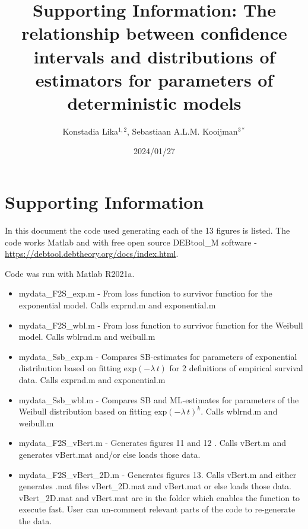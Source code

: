 \documentclass[12pt]{elsarticle}
\begin{document}
\title{Supporting Information: The relationship between confidence intervals and distributions of estimators for parameters of deterministic models}

\author{Konstadia Lika$^{1,2}$, 
        Sebastiaan A.L.M. Kooijman$^{3\ast}$}
  
\bigskip

\address{$^1$ Department of Biology, University of Crete, 70013, Heraklion, Greece}
\address{$^2$ Institute of Computational Mathematics,
Foundation of Research and Technology Hellas, 70013 Heraklion, Greece}
\address{$^3$  Amsterdam Institute for Life and Environment (A-LIFE), 
VU University Amsterdam, de Boelelaan 1087, 1081 HV, The Netherlands}
\address{$^\ast$ Corresponding author: bas.kooijman@vu.nl}

\date{2024/01/27}


\maketitle

\section{Supporting Information}

In this document the code used generating each of the 13 figures is listed. The code works Matlab\textsuperscript{\textcopyright} and with free open source DEBtool\_M software - \url{https://debtool.debtheory.org/docs/index.html}.

Code was run with Matlab\textsuperscript{\textcopyright} R2021a. 

\begin{itemize}
    \item mydata\_F2S\_exp.m - From loss function to survivor function for the exponential model. Calls exprnd.m and exponential.m
    \item mydata\_F2S\_wbl.m - From loss function to survivor function for the Weibull model. Calls wblrnd.m and weibull.m 
    \item mydata\_Ssb\_exp.m - Compares SB-estimates for parameters of exponential distribution based on fitting exp$(-\lambda \, t)$ for 2 definitions of empirical survival data. Calls exprnd.m and exponential.m
    \item mydata\_Ssb\_wbl.m - Compares SB and ML-estimates for parameters of the Weibull distribution based on fitting exp$(-\lambda \, t)^k$. Calls wblrnd.m and weibull.m 
    \item mydata\_F2S\_vBert.m - Generates figures 11 and 12 . Calls vBert.m and generates  vBert.mat and/or else loads those data.
    \item mydata\_F2S\_vBert\_2D.m  - Generates figures 13. Calls vBert.m and either generates .mat files vBert\_2D.mat and vBert.mat or else loads those data. vBert\_2D.mat and vBert.mat are in the folder which enables the function to execute fast. User can un-comment relevant parts of the code to re-generate the data. 
\end{itemize}
\end{document}
